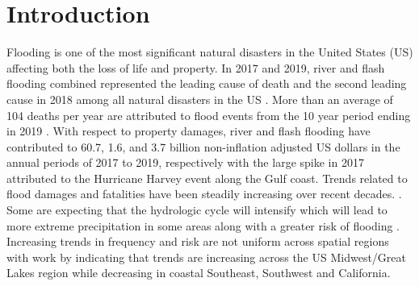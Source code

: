 \documentclass[draft]{dependencies/agujournal2019}
\begin{document}
\section{Introduction}
%
Flooding is one of the most significant natural disasters in the United States (US) affecting both the loss of life and property. 
In 2017 and 2019, river and flash flooding combined represented the leading cause of death and the second leading cause in 2018 among all natural disasters in the US \cite{national_weather_service_2020,national_weather_service_2019,national_weather_service_2018}. 
More than an average of 104 deaths per year are attributed to flood events from the 10 year period ending in 2019 \cite{us_department_of_commerce_2020}. 
With respect to property damages, river and flash flooding have contributed to 60.7, 1.6, and 3.7 billion non-inflation adjusted US dollars in the annual periods of 2017 to 2019, respectively \cite{national_weather_service_2020,national_weather_service_2019,national_weather_service_2018} with the large spike in 2017 attributed to the Hurricane Harvey event along the Gulf coast. 
Trends related to flood damages and fatalities have been steadily increasing over recent decades. \cite{mallakpour2015changing,downton2005reanalysis,kunkel1999temporal,pielke2000precipitation,corringham2019effect}. 
Some are expecting that the hydrologic cycle will intensify which will lead to more extreme precipitation in some areas along with a greater risk of flooding \cite{tabari2020climate,milly2002increasing,wing2018estimates}. 
Increasing trends in frequency and risk are not uniform across spatial regions with work by  indicating that trends are increasing across the US Midwest/Great Lakes region while decreasing in coastal Southeast, Southwest and California.
%
\end{document}
